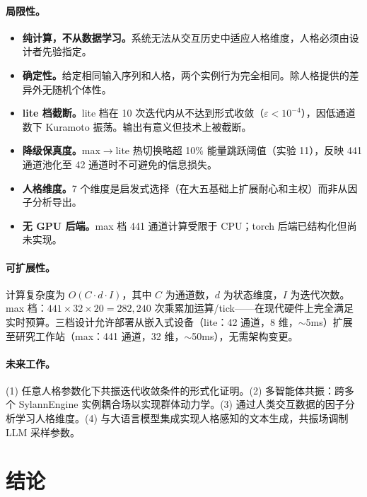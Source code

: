 \documentclass[UTF8,11pt]{ctexart}
\begin{document}
\paragraph{局限性。}
\begin{itemize}[leftmargin=*]
\item \textbf{纯计算，不从数据学习。}系统无法从交互历史中适应人格维度，人格必须由设计者先验指定。
\item \textbf{确定性。}给定相同输入序列和人格，两个实例行为完全相同。除人格提供的差异外无随机个体性。
\item \textbf{lite 档截断。}lite 档在 10 次迭代内从不达到形式收敛（$\varepsilon < 10^{-4}$），因低通道数下 Kuramoto 振荡。输出有意义但技术上被截断。
\item \textbf{降级保真度。}max$\to$lite 热切换略超 10\% 能量跳跃阈值（实验 11），反映 441 通道池化至 42 通道时不可避免的信息损失。
\item \textbf{人格维度。}7 个维度是启发式选择（在大五基础上扩展耐心和主权）而非从因子分析导出。
\item \textbf{无 GPU 后端。}max 档 441 通道计算受限于 CPU；torch 后端已结构化但尚未实现。
\end{itemize}

\paragraph{可扩展性。}计算复杂度为 $O(C \cdot d \cdot I)$，其中 $C$ 为通道数，$d$ 为状态维度，$I$ 为迭代次数。max 档：$441 \times 32 \times 20 = 282{,}240$ 次乘累加运算/tick——在现代硬件上完全满足实时预算。三档设计允许部署从嵌入式设备（lite：42 通道，8 维，$\sim$5ms）扩展至研究工作站（max：441 通道，32 维，$\sim$50ms），无需架构变更。

\paragraph{未来工作。}(1) 任意人格参数化下共振迭代收敛条件的形式化证明。(2) 多智能体共振：跨多个 SylannEngine 实例耦合场以实现群体动力学。(3) 通过人类交互数据的因子分析学习人格维度。(4) 与大语言模型集成实现人格感知的文本生成，共振场调制 LLM 采样参数。

\section{结论}
\label{sec:conclusion}
\end{document}
